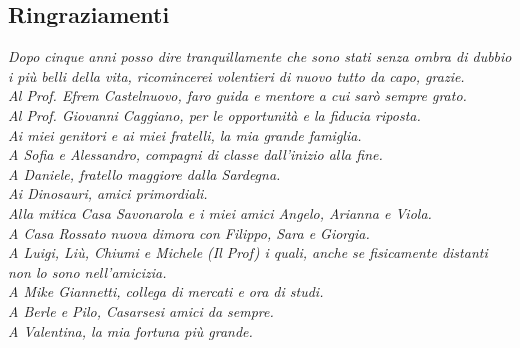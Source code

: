 \documentclass[12pt, a4paper]{article}
\begin{document}
\clearpage
\subsection*{Ringraziamenti}

\begin{flushleft}
\itshape
Dopo cinque anni posso dire tranquillamente che sono stati senza ombra di dubbio i più belli della vita, ricomincerei volentieri di nuovo tutto da capo, grazie.\\[1em]

Al Prof. Efrem Castelnuovo, faro guida e mentore a cui sarò sempre grato.\\[1em]

Al Prof. Giovanni Caggiano, per le opportunità e la fiducia riposta.\\[1em]

Ai miei genitori e ai miei fratelli, la mia grande famiglia.\\[1em]

A Sofia e Alessandro, compagni di classe dall'inizio alla fine.\\[1em]

A Daniele, fratello maggiore dalla Sardegna.\\[1em]

Ai Dinosauri, amici primordiali.\\[1em]

Alla mitica Casa Savonarola e i miei amici Angelo, Arianna e Viola.\\[1em]

A Casa Rossato nuova dimora con Filippo, Sara e Giorgia.\\[1em]

A Luigi, Liù, Chiumi e Michele (Il Prof) i quali, anche se fisicamente distanti non lo sono nell'amicizia.\\[1em]

A Mike Giannetti, collega di mercati e ora di studi.\\[1em]

A Berle e Pilo, Casarsesi amici da sempre.\\[2em]

A Valentina, la mia fortuna più grande.
\end{flushleft}
\end{document}
